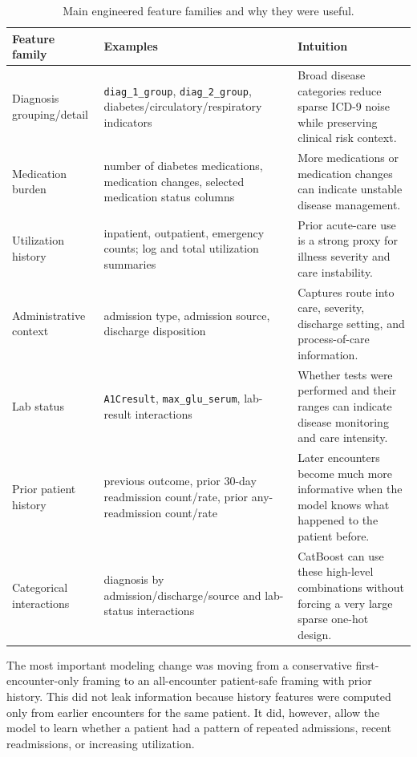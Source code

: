 \documentclass[10pt]{article}
\begin{document}
\begin{table}[H]
\centering
\caption{Main engineered feature families and why they were useful.}
\small
\begin{tabularx}{0.98\textwidth}{p{1.55in}p{2.45in}Y}
\toprule
Feature family & Examples & Intuition \\
\midrule
Diagnosis grouping/detail & \texttt{diag\_1\_group}, \texttt{diag\_2\_group}, diabetes/circulatory/respiratory indicators & Broad disease categories reduce sparse ICD-9 noise while preserving clinical risk context. \\
Medication burden & number of diabetes medications, medication changes, selected medication status columns & More medications or medication changes can indicate unstable disease management. \\
Utilization history & inpatient, outpatient, emergency counts; log and total utilization summaries & Prior acute-care use is a strong proxy for illness severity and care instability. \\
Administrative context & admission type, admission source, discharge disposition & Captures route into care, severity, discharge setting, and process-of-care information. \\
Lab status & \texttt{A1Cresult}, \texttt{max\_glu\_serum}, lab-result interactions & Whether tests were performed and their ranges can indicate disease monitoring and care intensity. \\
Prior patient history & previous outcome, prior 30-day readmission count/rate, prior any-readmission count/rate & Later encounters become much more informative when the model knows what happened to the patient before. \\
Categorical interactions & diagnosis by admission/discharge/source and lab-status interactions & CatBoost can use these high-level combinations without forcing a very large sparse one-hot design. \\
\bottomrule
\end{tabularx}
\end{table}

The most important modeling change was moving from a conservative first-encounter-only framing to an all-encounter patient-safe framing with prior history. This did not leak information because history features were computed only from earlier encounters for the same patient. It did, however, allow the model to learn whether a patient had a pattern of repeated admissions, recent readmissions, or increasing utilization.
\end{document}
